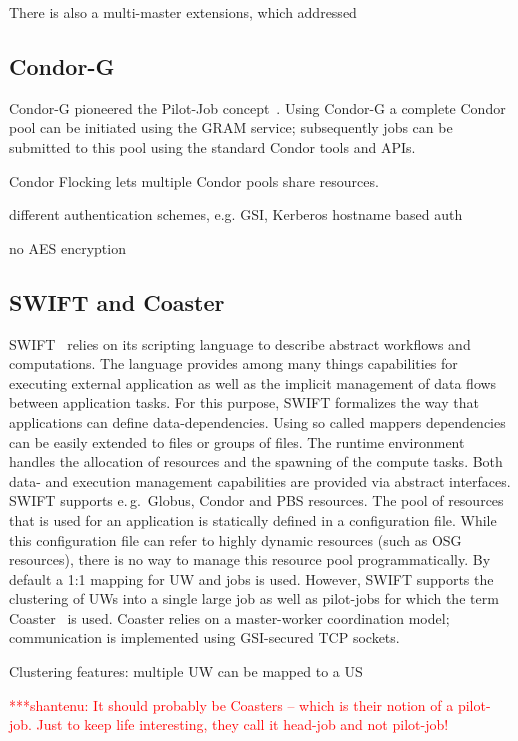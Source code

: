 \documentclass[conference,final]{IEEEtran}
\newcommand{\jhanote}[1]{ {\textcolor{red} { ***shantenu: #1 }}}
\newcommand{\jhanote}[1]{}
\begin{document}
There is also a multi-master extensions, which addressed




\subsection{Condor-G}

Condor-G pioneered the Pilot-Job concept~\cite{condor-g}. Using Condor-G 
a complete Condor pool can be initiated using the GRAM service; subsequently 
jobs can be submitted to this pool using the standard Condor tools and APIs.

Condor Flocking lets multiple Condor pools share resources.

different authentication schemes, e.g. GSI, Kerberos
hostname based auth

no AES encryption

\subsection{SWIFT and Coaster}

SWIFT~\cite{Wilde2011} relies on its scripting language to describe abstract
workflows and computations. The language provides among many things capabilities
for executing external application as well as the implicit management of data
flows between application tasks. For this purpose, SWIFT formalizes the way that
applications can define data-dependencies. Using so called mappers dependencies
can be easily extended to files or groups of files. The runtime environment
handles the allocation of resources and the spawning of the compute tasks. Both
data- and execution management capabilities are provided via abstract
interfaces. SWIFT supports e.\,g.\ Globus, Condor and PBS resources. The pool of
resources that is used for an application is statically defined in a
configuration file. While this configuration file can refer to highly dynamic
resources (such as OSG resources), there is no way to manage this resource pool
programmatically. By default a 1:1 mapping for UW and jobs is used. However,
SWIFT supports the clustering of UWs into a single large job as well as
pilot-jobs for which the term Coaster~\cite{coasters} is used. Coaster relies on
a master-worker coordination model; communication is implemented using
GSI-secured TCP sockets.

Clustering features: multiple UW can be mapped to a US


\jhanote{It should probably be Coasters -- which is their notion of a pilot-job. Just
to keep life interesting, they call it head-job and not pilot-job!}
\end{document}

